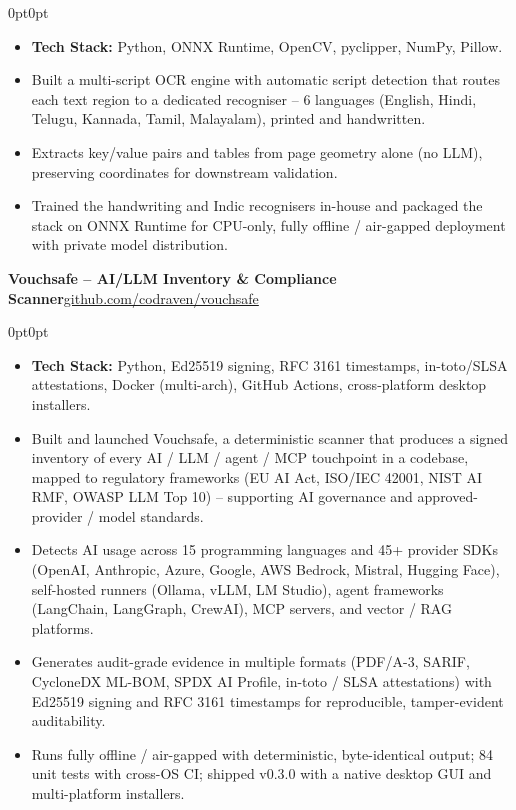 \documentclass[10pt, letterpaper]{article}
\newenvironment{onecolentry}{
    \begin{adjustwidth}{0pt}{0pt}
}{
    \end{adjustwidth}
}
\newenvironment{highlights}{
    \begin{itemize}[topsep=2pt, parsep=0pt, partopsep=0pt, itemsep=2pt, leftmargin=0.8cm]
}{
    \end{itemize}
}
\newcommand{\headerrow}[2]{%
    \noindent\textbf{#1}\hfill #2\par%
}
\begin{document}
\vspace{-2pt}
\begin{onecolentry}
\begin{highlights}
    \item \textbf{Tech Stack:} Python, ONNX Runtime, OpenCV, pyclipper, NumPy, Pillow.
    \item Built a multi-script OCR engine with automatic script detection that routes each text region to a dedicated recogniser -- 6 languages (English, Hindi, Telugu, Kannada, Tamil, Malayalam), printed and handwritten.
    \item Extracts key/value pairs and tables from page geometry alone (no LLM), preserving coordinates for downstream validation.
    \item Trained the handwriting and Indic recognisers in-house and packaged the stack on ONNX Runtime for CPU-only, fully offline / air-gapped deployment with private model distribution.
\end{highlights}
\end{onecolentry}

\vspace{6pt}
\headerrow{Vouchsafe -- AI/LLM Inventory \& Compliance Scanner}{\href{https://github.com/codraven/vouchsafe}{github.com/codraven/vouchsafe}}

\vspace{-2pt}
\begin{onecolentry}
\begin{highlights}
    \item \textbf{Tech Stack:} Python, Ed25519 signing, RFC 3161 timestamps, in-toto/SLSA attestations, Docker (multi-arch), GitHub Actions, cross-platform desktop installers.
    \item Built and launched Vouchsafe, a deterministic scanner that produces a signed inventory of every AI / LLM / agent / MCP touchpoint in a codebase, mapped to regulatory frameworks (EU AI Act, ISO/IEC 42001, NIST AI RMF, OWASP LLM Top 10) -- supporting AI governance and approved-provider / model standards.
    \item Detects AI usage across 15 programming languages and 45+ provider SDKs (OpenAI, Anthropic, Azure, Google, AWS Bedrock, Mistral, Hugging Face), self-hosted runners (Ollama, vLLM, LM Studio), agent frameworks (LangChain, LangGraph, CrewAI), MCP servers, and vector / RAG platforms.
    \item Generates audit-grade evidence in multiple formats (PDF/A-3, SARIF, CycloneDX ML-BOM, SPDX AI Profile, in-toto / SLSA attestations) with Ed25519 signing and RFC 3161 timestamps for reproducible, tamper-evident auditability.
    \item Runs fully offline / air-gapped with deterministic, byte-identical output; 84 unit tests with cross-OS CI; shipped v0.3.0 with a native desktop GUI and multi-platform installers.
\end{highlights}
\end{onecolentry}
\end{document}
